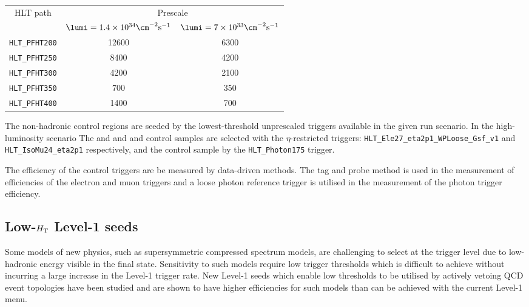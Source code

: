 \begin{table}[h!]
\footnotesize
\centering
\begin{tabular}{c|cc} 
\hline
\hline
HLT path & \multicolumn{2}{c}{Prescale} \\
         & $\lumi=1.4\times10^{34}\cm^{-2}{\rm s}^{-1}$  & $\lumi=7\times10^{33}\cm^{-2}{\rm s}^{-1}$     \\
\hline
\texttt{HLT\_PFHT200} & 12600 & 6300 \\
\texttt{HLT\_PFHT250} & 8400  & 4200 \\
\texttt{HLT\_PFHT300} & 4200  & 2100 \\
\texttt{HLT\_PFHT350} & 700   & 350  \\
\texttt{HLT\_PFHT400} & 1400  & 700  \\
\hline
\hline

\end{tabular}
\label{tab:2015_Hadronic_Control_Triggers}
\end{table}


The non-hadronic control regions are seeded by the lowest-threshold unprescaled 
triggers available in the given run scenario. In the high-luminosity scenario The \ej 
and \eej and \mj and \mmj control samples are selected with the $\eta$-restricted 
triggers: \verb!HLT_Ele27_eta2p1_WPLoose_Gsf_v1! and \verb!HLT_IsoMu24_eta2p1! respectively,
and the \gj control sample by the \verb!HLT_Photon175! trigger. 

The efficiency of the control triggers are be measured by data-driven methods. The tag 
and probe method is used in the measurement of efficiencies of the electron and muon triggers 
and a loose photon reference trigger is utilised in the measurement of the photon trigger
efficiency.








\subsection{Low-$\mbox{$H_\text{T}$}$ Level-1 seeds}

Some models of new physics, such as supersymmetric compressed spectrum models, are challenging to select at the trigger level due to low-hadronic energy visible in the final state. Sensitivity to such models require low trigger thresholds which is difficult to achieve without incurring a large increase in the Level-1 trigger rate. New Level-1 seeds which enable low thresholds to be utilised by actively vetoing QCD event topologies have been studied and are shown to have higher efficiencies for such models than can be achieved with the current Level-1 menu.

